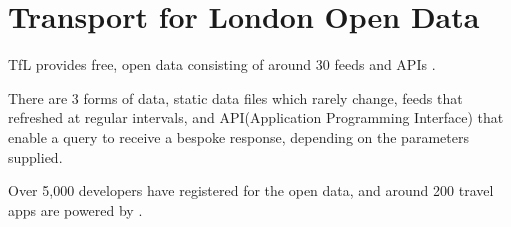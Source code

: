 \section{Transport for London Open Data}

\par TfL provides free, open data consisting of around 30 feeds and APIs \cite{open_data}. 

\par There are 3 forms of data, static data files which rarely change, feeds that refreshed at regular intervals, and API(Application Programming Interface) that enable a query to receive a bespoke response, depending on the parameters supplied.

Over 5,000 developers have registered for the open data\cite{open_data}, and around 200 travel apps are powered by  \cite{tfl_annual_report_13/14}.
